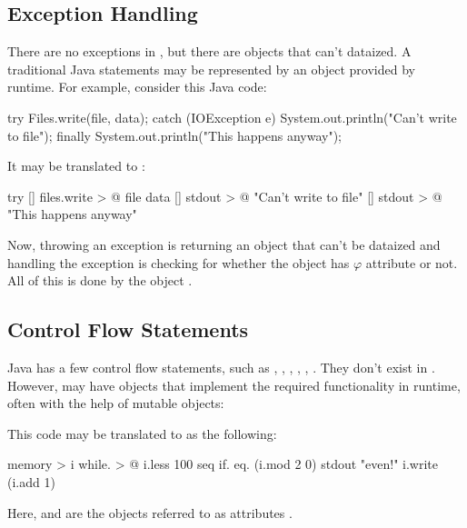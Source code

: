 \subsection{Exception Handling}

There are no exceptions in \eo{}, but there are objects that
can't dataized. A traditional Java  statements
may be represented by an object  provided by \eo{} runtime.
For example, consider this Java code:

\begin{ffcode}
try {
  Files.write(file, data);
} catch (IOException e) {
  System.out.println("Can't write to file");
} finally {
  System.out.println("This happens anyway");
}
\end{ffcode}

It may be translated to \eo{}:

\begin{ffcode}
try
  []
    files.write > @
      file
      data
  []
    stdout > @
      "Can't write to file"
  []
    stdout > @
      "This happens anyway"
\end{ffcode}

Now, throwing an exception is returning an object that can't be
dataized and handling the exception is checking for whether the
object has $\varphi$ attribute or not. All of this is done
by the object .

\subsection{Control Flow Statements}

Java has a few control flow statements, such as
, , , , , .
They don't exist in \eo{}. However, \eo{} may have objects
that implement the required functionality in runtime, often with the
help of mutable objects:


This code may be translated to \eo{} as the following:

\begin{ffcode}
[]
  memory > i
  while. > @
    i.less 100
    seq
      if.
        eq. (i.mod 2 0)
        stdout "even!"
      i.write (i.add 1)
\end{ffcode}

Here,  and  are the objects referred to as attributes
.
